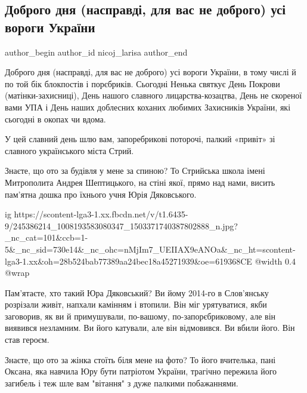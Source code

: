  
 
 
 
 
 
\subsection{Доброго дня (насправді, для вас не доброго) усі вороги України}
\label{sec:14_10_2021.fb.nicoj_larisa.1.vragi_pokrova}
 
\ifcmt
 author_begin
   author_id nicoj_larisa
 author_end
\fi

Доброго дня (насправді, для вас не доброго) усі вороги України, в тому числі й
по той бік блокпостів і порєбриків. Сьогодні Ненька святкує День Покрови
(матінки-захисниці), День нашого славного лицарства-козацтва, День не скореної
вами УПА і День наших доблесних коханих любимих Захисників України, які
сьогодні в окопах чи вдома. 

У цей славний день шлю вам, запоребрикові поторочі, палкий «привіт» зі славного
українського міста Стрий.

Знаєте, що ото за будівля у мене за спиною? То Стрийська школа імені
Митрополита Андрея Шептицького, на стіні якої, прямо над нами, висить пам’ятна
дошка про їхнього учня Юрія Дяковського. 

\ifcmt
  ig https://scontent-lga3-1.xx.fbcdn.net/v/t1.6435-9/245386214_1008193583080347_1503371740387802888_n.jpg?_nc_cat=101&ccb=1-5&_nc_sid=730e14&_nc_ohc=nMjIm7_UEIIAX9eANOa&_nc_ht=scontent-lga3-1.xx&oh=28b524bab77389aa24bec18a45271939&oe=619368CE
  @width 0.4
  @wrap 
\fi

Пам’ятаєте, хто такий Юра Дяковський? Ви йому 2014-го в Слов’янську розрізали
живіт, напхали камінням і втопили. Він міг урятуватися, якби заговорив, як ви й
примушували, по-вашому, по-запорєбриковому, але він виявився незламним. Ви його
катували, але він відмовився. Ви вбили його. Він став героєм.

Знаєте, що ото за жінка стоїть біля мене на фото? То його вчителька, пані
Оксана, яка навчила Юру бути патріотом України, трагічно пережила його загибель
і теж шле вам "вітання" з дуже палкими побажаннями.

